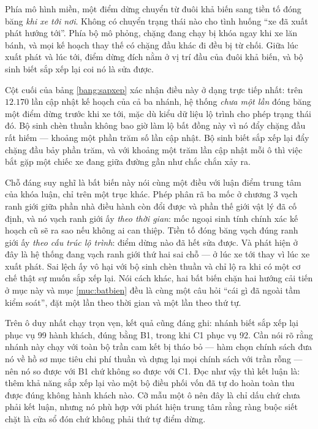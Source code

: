 Phía mô hình miền, một điểm dừng chuyển từ đuôi khả biến sang tiền tố đóng băng \emph{khi xe
tới nơi}. Không có chuyển trạng thái nào cho tình huống ``xe đã xuất phát hướng tới''. Phía bộ
mô phỏng, chặng đang chạy bị khóa ngay khi xe lăn bánh, và mọi kế hoạch thay thế có chặng đầu
khác đi đều bị từ chối. Giữa lúc xuất phát và lúc tới, điểm dừng đích nằm ở vị trí đầu của đuôi
khả biến, và bộ sinh biết sắp xếp lại coi nó là sửa được.

Cột cuối của bảng \ref{bang:sapxep} xác nhận điều này ở dạng trực tiếp nhất: trên $12.170$ lần
cập nhật kế hoạch của cả ba nhánh, hệ thống \emph{chưa một lần} đóng băng một điểm dừng trước
khi xe tới, mặc dù kiểu dữ liệu lộ trình cho phép trạng thái đó. Bộ sinh chèn thuần không bao
giờ làm lộ bất đồng này vì nó đẩy chặng đầu rất hiếm --- khoảng một phần trăm số lần cập nhật.
Bộ sinh biết sắp xếp lại đẩy chặng đầu bảy phần trăm, và với khoảng một trăm lần cập nhật mỗi
ô thì việc bắt gặp một chiếc xe đang giữa đường gần như chắc chắn xảy ra.

Chỗ đáng suy nghĩ là bất biến này nói cùng một điều với luận điểm trung tâm của khóa luận, chỉ
trên một trục khác. Phép phân rã ba mốc ở chương 3 vạch ranh giới giữa phần nhà điều hành còn
đổi được và phần thế giới vật lý đã cố định, và nó vạch ranh giới ấy \emph{theo thời gian}: mốc
ngoại sinh tính chính xác kế hoạch cũ sẽ ra sao nếu không ai can thiệp. Tiền tố đóng băng vạch
đúng ranh giới ấy \emph{theo cấu trúc lộ trình}: điểm dừng nào đã hết sửa được. Và phát hiện ở
đây là hệ thống đang vạch ranh giới thứ hai sai chỗ --- ở lúc xe tới thay vì lúc xe xuất phát.
Sai lệch ấy vô hại với bộ sinh chèn thuần và chỉ lộ ra khi có một cơ chế thật sự muốn sắp xếp
lại. Nói cách khác, hai bất biến chặn hai hướng cải tiến ở mục này và mục \ref{muc:batbien} đều
là cùng một câu hỏi ``cái gì đã ngoài tầm kiểm soát'', đặt một lần theo thời gian và một lần
theo thứ tự.

Trên ô duy nhất chạy trọn vẹn, kết quả cũng đáng ghi: nhánh biết sắp xếp lại phục vụ 99 hành
khách, đúng bằng B1, trong khi C1 phục vụ 92. Cần nói rõ rằng nhánh này chạy với toàn bộ trần
cam kết bị tháo bỏ --- hàm chọn chính sách đưa nó về hồ sơ mục tiêu chi phí thuần và dựng lại
mọi chính sách với trần rỗng --- nên nó so được với B1 chứ không so được với C1. Đọc như vậy thì
kết luận là: thêm khả năng sắp xếp lại vào một bộ điều phối vốn đã tự do hoàn toàn thu được đúng
không hành khách nào. Cỡ mẫu một ô nên đây là chỉ dấu chứ chưa phải kết luận, nhưng nó phù hợp
với phát hiện trung tâm rằng ràng buộc siết chặt là cửa sổ đón chứ không phải thứ tự điểm dừng.

